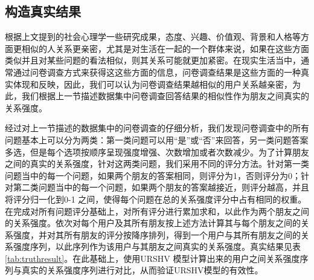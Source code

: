 \subsection{构造真实结果}
根据上文提到的社会心理学一些研究成果，态度、兴趣、价值观、背景和人格等方面更相似的人关系更亲密，尤其是对生活在一起的一个群体来说，如果在这些方面类似并且对某些问题的看法相似，则其关系可能就更加紧密。在现实生活当中，通常通过问卷调查方式来获得这这些方面的信息，问卷调查结果是这些方面的一种真实体现和反映，因此，我们可以认为问卷调查结果越相似的用户关系越亲密，为此，我们根据上一节描述数据集中问卷调查回答结果的相似性作为朋友之间真实的关系强度。
\par 经过对上一节描述的数据集中的问卷调查的仔细分析，我们发现问卷调查中的所有问题基本上可以分为两类：第一类问题可以用“是”或“否”来回答，另一类问题答案多选，但是每个选项按顺序呈现强度增强、次数增加或者次数减少。为了计算朋友之间的真实的关系强度，针对这两类问题，我们采用不同的评分方法。针对第一类问题当中的每一个问题，如果两个朋友的答案相同，则评分为1，否则评分为0；针对第二类问题当中的每一个问题，如果两个朋友的答案越接近，则评分越高，并且将评分归一化到0-1 之间，使得每个问题在总的关系强度评分中占有相同的权重。在完成对所有问题评分基础上，对所有评分进行累加求和，以此作为两个朋友之间的关系强度。依次对每个用户及其所有朋友按上述方法计算其与每个朋友之间的关系强度，并对其所有朋友的评分按降序排列，得到一个用户与其所有朋友之间的关系强度序列，以此序列作为该用户与其朋友之间真实的关系强度。真实结果见表\ref{tab:truthresult}。在此基础上，使用URSHV 模型计算出来的用户之间关系强度序列与真实的关系强度序列进行对比，从而验证URSHV模型的有效性。
